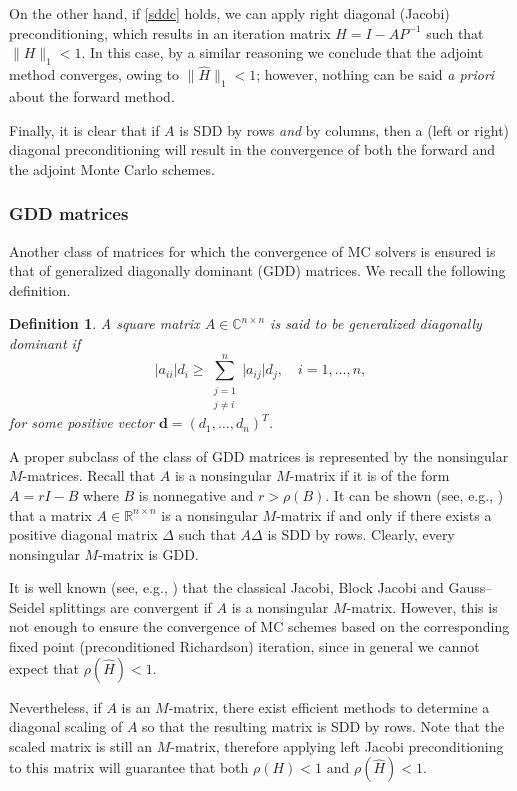 \documentclass[times]{nlaauth}
\newtheorem{defn}{Definition}
\begin{document}
On the other hand, if \eqref{sddc} holds, we can apply right diagonal
(Jacobi) preconditioning, which
results in an iteration matrix $H=I-AP^{-1}$ such that $\lVert H
\rVert_{1}<1$.
In this case, by a similar reasoning we
conclude that the adjoint method converges, owing to $\lVert
\hat{H}\rVert_1<1$; however,
nothing can be said \textit{a priori} about the forward method.

Finally, it is clear that if $A$ is SDD by rows {\em and} by columns, then
a (left or right) diagonal preconditioning will result in the convergence
of both the forward and the adjoint Monte Carlo schemes.

\subsubsection{GDD matrices}
\label{sec:gdd}

Another class of matrices for which the convergence of
MC solvers is ensured is that of generalized diagonally
dominant (GDD) matrices. We recall the following definition.

\begin{defn}
A square matrix $A\in\mathbb{C}^{n\times n}$ is said to be {\em generalized
diagonally dominant} if
\[
 \lvert a_{ii}\rvert d_i \ge \sum_{\substack{j=1\\j\ne i}}^n \lvert
a_{ij}\rvert
d_j, \quad i=1,\ldots,n,
\]
for some positive vector $\mathbf{d}=(d_1,\ldots,d_n)^T$.
\end{defn}

A proper subclass of the class of GDD matrices is represented
by the nonsingular $M$-matrices.
Recall that $A$ is a nonsingular $M$-matrix if it is of the form
$A=r I - B$ where $B$ is nonnegative and $r>\rho(B)$.
It can be shown (see, e.g., \cite{BP1979}) that  a matrix
$A\in\mathbb{R}^{n\times n}$ is a nonsingular $M$-matrix if and only
if there exists a positive diagonal matrix $\Delta$ such that
$A\Delta$ is SDD by rows. Clearly, every
nonsingular $M$-matrix is GDD.

It is well known (see, e.g., \cite{Ax1994}) that the classical
Jacobi, Block Jacobi and Gauss--Seidel splittings are
convergent if $A$ is a nonsingular $M$-matrix.
However, this is not enough to ensure the
convergence of MC schemes based on the corresponding fixed point
(preconditioned Richardson) iteration, since in general
we cannot expect that $\rho(\hat{H})<1$.

Nevertheless, if $A$ is an $M$-matrix, there exist efficient methods
to determine a diagonal scaling of $A$ so that the resulting matrix
is SDD by rows. Note that the scaled matrix is still an $M$-matrix,
therefore applying left Jacobi preconditioning to this matrix will
guarantee that both $\rho(H)<1$ and $\rho(\hat{H})<1$.
\end{document}
